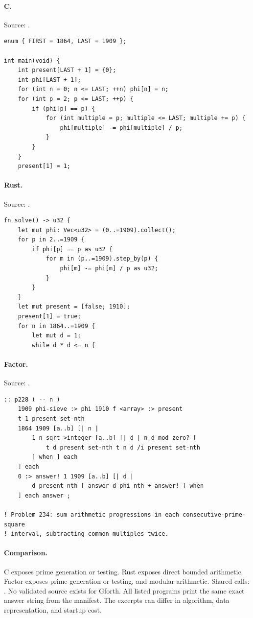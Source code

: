\paragraph{C.} Source: .
\begin{lstlisting}
enum { FIRST = 1864, LAST = 1909 };

int main(void) {
    int present[LAST + 1] = {0};
    int phi[LAST + 1];
    for (int n = 0; n <= LAST; ++n) phi[n] = n;
    for (int p = 2; p <= LAST; ++p) {
        if (phi[p] == p) {
            for (int multiple = p; multiple <= LAST; multiple += p) {
                phi[multiple] -= phi[multiple] / p;
            }
        }
    }
    present[1] = 1;
\end{lstlisting}

\paragraph{Rust.} Source: .
\begin{lstlisting}
fn solve() -> u32 {
    let mut phi: Vec<u32> = (0..=1909).collect();
    for p in 2..=1909 {
        if phi[p] == p as u32 {
            for m in (p..=1909).step_by(p) {
                phi[m] -= phi[m] / p as u32;
            }
        }
    }
    let mut present = [false; 1910];
    present[1] = true;
    for n in 1864..=1909 {
        let mut d = 1;
        while d * d <= n {
\end{lstlisting}

\paragraph{Factor.} Source: .
\begin{lstlisting}
:: p228 ( -- n )
    1909 phi-sieve :> phi 1910 f <array> :> present
    t 1 present set-nth
    1864 1909 [a..b] [| n |
        1 n sqrt >integer [a..b] [| d | n d mod zero? [
            t d present set-nth t n d /i present set-nth
        ] when ] each
    ] each
    0 :> answer! 1 1909 [a..b] [| d |
        d present nth [ answer d phi nth + answer! ] when
    ] each answer ;

! Problem 234: sum arithmetic progressions in each consecutive-prime-square
! interval, subtracting common multiples twice.
\end{lstlisting}

\paragraph{Comparison.}
C exposes prime generation or testing. Rust exposes direct bounded arithmetic. Factor exposes prime generation or testing, and modular arithmetic. Shared calls: \texttt{}.
No validated source exists for Gforth.
All listed programs print the same exact answer string from the manifest. The excerpts can differ in algorithm, data representation, and startup cost.

